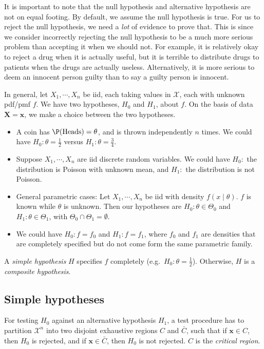 \documentclass[a4paper]{article}
\begin{document}
It is important to note that the null hypothesis and alternative hypothesis are not on equal footing. By default, we assume the null hypothesis is true. For us to reject the null hypothesis, we need a \emph{lot} of evidence to prove that. This is since we consider incorrectly rejecting the null hypothesis to be a much more serious problem than accepting it when we should not. For example, it is relatively okay to reject a drug when it is actually useful, but it is terrible to distribute drugs to patients when the drugs are actually useless. Alternatively, it is more serious to deem an innocent person guilty than to say a guilty person is innocent.

In general, let $X_1, \cdots, X_n$ be iid, each taking values in $\mathcal{X}$, each with unknown pdf/pmf $f$. We have two hypotheses, $H_0$ and $H_1$, about $f$. On the basis of data $\mathbf{X} = \mathbf{x}$, we make a choice between the two hypotheses.

\begin{eg}\leavevmode
  \begin{itemize}
    \item A coin has $\P(\text{Heads}) = \theta$, and is thrown independently $n$ times. We could have $H_0:\theta = \frac{1}{2}$ versus $H_1: \theta = \frac{3}{4}.$
    \item Suppose $X_1, \cdots, X_n$ are iid discrete random variables. We could have $H_0:$ the distribution is Poisson with unknown mean, and $H_1:$ the distribution is not Poisson.
    \item General parametric cases: Let $X_1, \cdots , X_n$ be iid with density $f(x\mid \theta)$. $f$ is known while $\theta$ is unknown. Then our hypotheses are $H_0: \theta\in \Theta_0$ and $H_1:\theta\in \Theta_1$, with $\Theta_0\cap \Theta_1 = \emptyset$.
    \item We could have $H_0: f = f_0$ and $H_1: f = f_1$, where $f_0$ and $f_1$ are densities that are completely specified but do not come form the same parametric family.
  \end{itemize}
\end{eg}

\begin{defi}
  A \emph{simple hypothesis} $H$ specifies $f$ completely (e.g.\ $H_0: \theta = \frac{1}{2}$). Otherwise, $H$ is a \emph{composite hypothesis}.
\end{defi}

\subsection{Simple hypotheses}
\begin{defi}
  For testing $H_0$ against an alternative hypothesis $H_1$, a test procedure has to partition $\mathcal{X}^n$ into two disjoint exhaustive regions $C$ and $\bar C$, such that if $\mathbf{x}\in C$, then $H_0$ is rejected, and if $\mathbf{x}\in \bar C$, then $H_0$ is not rejected. $C$ is the \emph{critical region}.
\end{defi}
\end{document}
